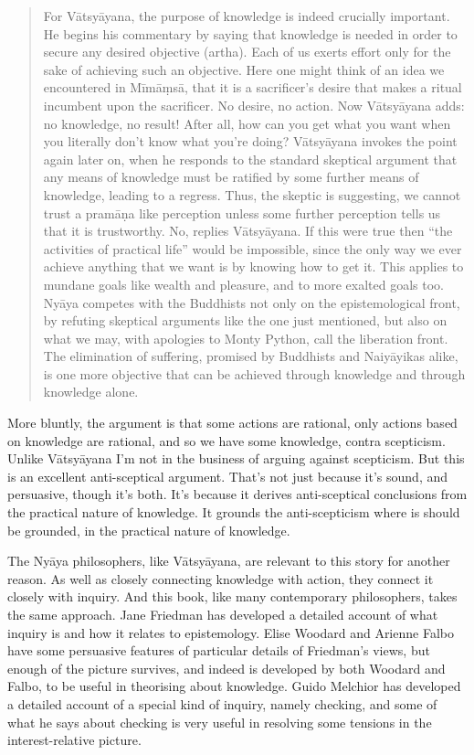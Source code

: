 \documentclass[
  11pt,
]{book}
\begin{document}
\begin{quote}
For Vātsyāyana, the purpose of knowledge is indeed crucially important. He begins his commentary by saying that knowledge is needed in order to secure any desired objective (artha). Each of us exerts effort only for the sake of achieving such an objective. Here one might think of an idea we encountered in Mīmāṃsā, that it is a sacrificer's desire that makes a ritual incumbent upon the sacrificer. No desire, no action. Now Vātsyāyana adds: no knowledge, no result! After all, how can you get what you want when you literally don't know what you're doing? Vātsyāyana invokes the point again later on, when he responds to the standard skeptical argument that any means of knowledge must be ratified by some further means of knowledge, leading to a regress. Thus, the skeptic is suggesting, we cannot trust a pramāṇa like perception unless some further perception tells us that it is trustworthy. No, replies Vātsyāyana. If this were true then ``the activities of practical life'' would be impossible, since the only way we ever achieve anything that we want is by knowing how to get it. This applies to mundane goals like wealth and pleasure, and to more exalted goals too. Nyāya competes with the Buddhists not only on the epistemological front, by refuting skeptical arguments like the one just mentioned, but also on what we may, with apologies to Monty Python, call the liberation front. The elimination of suffering, promised by Buddhists and Naiyāyikas alike, is one more objective that can be achieved through knowledge and through knowledge alone. \citep[170]{AdamsonGaneri2020}
\end{quote}

More bluntly, the argument is that some actions are rational, only actions based on knowledge are rational, and so we have some knowledge, contra scepticism. Unlike Vātsyāyana I'm not in the business of arguing against scepticism. But this is an excellent anti-sceptical argument. That's not just because it's sound, and persuasive, though it's both. It's because it derives anti-sceptical conclusions from the practical nature of knowledge. It grounds the anti-scepticism where is should be grounded, in the practical nature of knowledge.

The Nyāya philosophers, like Vātsyāyana, are relevant to this story for another reason. As well as closely connecting knowledge with action, they connect it closely with inquiry. And this book, like many contemporary philosophers, takes the same approach. Jane Friedman \citetext{\citeyear{Friedman2019a}; \citeyear{Friedman2019b}; \citeyear{Friedman2020}} has developed a detailed account of what inquiry is and how it relates to epistemology. Elise Woodard \citeyearpar{Woodard2021} and Arienne Falbo \citeyearpar{Falbo2021} have some persuasive features of particular details of Friedman's views, but enough of the picture survives, and indeed is developed by both Woodard and Falbo, to be useful in theorising about knowledge. Guido Melchior \citeyearpar{Melchior2019} has developed a detailed account of a special kind of inquiry, namely checking, and some of what he says about checking is very useful in resolving some tensions in the interest-relative picture.
\end{document}
